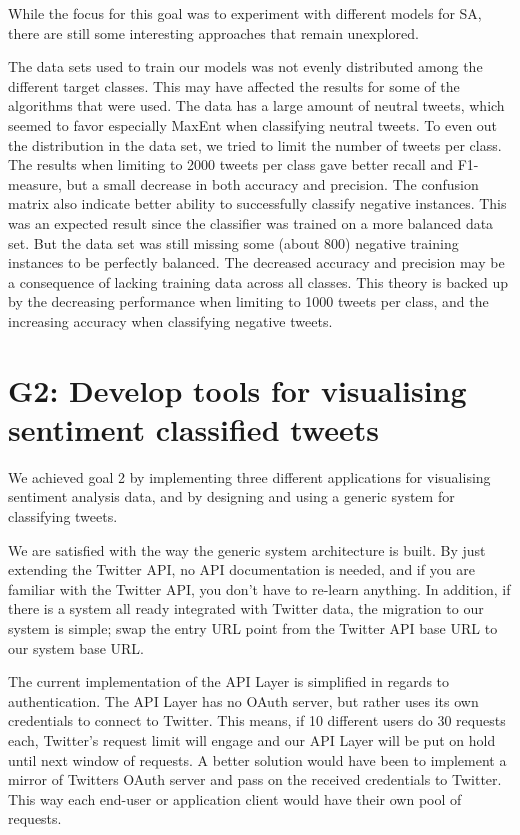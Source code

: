 While the focus for this goal was to experiment with different models for SA, there are still some interesting approaches that remain unexplored. 

The data sets used to train our models was not evenly distributed among the different target classes. This may have affected the results for some of the algorithms that were used. The data has a large amount of neutral tweets, which seemed to favor especially MaxEnt when classifying neutral tweets. To even out the distribution in the data set, we tried to limit the number of tweets per class. The results when limiting to 2000 tweets per class gave better recall and F1-measure, but a small decrease in both accuracy and precision. The confusion matrix also indicate better ability to successfully classify negative instances. This was an expected result since the classifier was trained on a more balanced data set. But the data set was still missing some (about 800) negative training instances to be perfectly balanced. The decreased accuracy and precision may be a consequence of lacking training data across all classes. This theory is backed up by the decreasing performance when limiting to 1000 tweets per class, and the increasing accuracy when classifying negative tweets. 


\section{G2: Develop tools for visualising sentiment classified tweets}

We achieved goal 2 by implementing three different applications for visualising sentiment analysis data, and by designing and using a generic system for classifying tweets. 

We are satisfied with the way the generic system architecture is built. By just extending the Twitter API, no API documentation is needed, and if you are familiar with the Twitter API, you don't have to re-learn anything. In addition, if there is a system all ready integrated with Twitter data, the migration to our system is simple; swap the entry URL point from the Twitter API base URL to our system base URL. 

The current implementation of the API Layer is simplified in regards to authentication. The API Layer has no OAuth server, but rather uses its own credentials to connect to Twitter. This means, if 10 different users do 30 requests each, Twitter's request limit will engage and our API Layer will be put on hold until next window of requests. A better solution would have been to implement a mirror of Twitters OAuth server and pass on the received credentials to Twitter. This way each end-user or application client would have their own pool of requests. 

